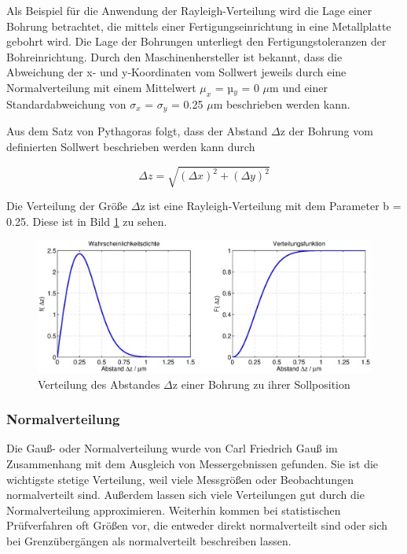\noindent Als Beispiel f\"{u}r die Anwendung der Rayleigh-Verteilung wird die Lage einer Bohrung betrachtet, die mittels einer Fertigungseinrichtung in eine Metallplatte gebohrt wird. Die Lage der Bohrungen unterliegt den Fertigungstoleranzen der Bohreinrichtung. Durch den Maschinenhersteller ist bekannt, dass die Abweichung der x- und y-Koordinaten vom Sollwert jeweils durch eine Normalverteilung mit einem Mittelwert $\mu_{x}$ = µ$_{y}$ = 0 $\mu$m und einer Standardabweichung von $\sigma_{x}$ = $\sigma_{y}$ = 0.25 $\mu$m beschrieben werden kann.\newline

\noindent Aus dem Satz von Pythagoras folgt, dass der Abstand $\Delta$z der Bohrung vom definierten Sollwert beschrieben werden kann durch

\begin{equation}\label{eq:fourtwohundredsix}
\Delta z=\sqrt{\left(\Delta x\right)^{2} +\left(\Delta y\right)^{2}}
\end{equation}

\noindent Die Verteilung der Gr\"{o}{\ss}e $\Delta$z ist eine Rayleigh-Verteilung mit dem Parameter b = 0.25. Diese ist in Bild \ref{fig:Stetig_Rayleigh_AbstandBohrung} zu sehen.

\begin{figure}[H]
  \centerline{\includegraphics[width=1\textwidth]{Kapitel4/Bilder/image33}}
  \caption{Verteilung des Abstandes $\Delta$z einer Bohrung zu ihrer Sollposition}
  \label{fig:Stetig_Rayleigh_AbstandBohrung}
\end{figure}

\subsubsection{Normalverteilung}

\noindent Die Gau{\ss}- oder Normalverteilung wurde von Carl Friedrich Gau{\ss} im Zusammenhang mit dem Ausgleich von Messergebnissen gefunden. Sie ist die wichtigste stetige Verteilung, weil viele Messgr\"{o}{\ss}en oder Beobachtungen normalverteilt sind. Au{\ss}erdem lassen sich viele Verteilungen gut durch die Normalverteilung approximieren. Weiterhin kommen bei statistischen Pr\"{u}fverfahren oft Gr\"{o}{\ss}en vor, die entweder direkt normalverteilt sind oder sich bei Grenz\"{u}berg\"{a}ngen als normalverteilt beschreiben lassen.\bigskip

